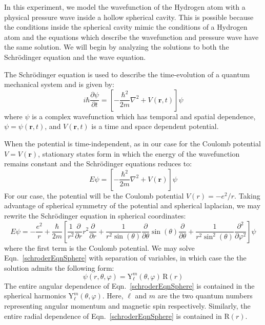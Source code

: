 \documentclass[12pt]{article}
\renewcommand{\vec}[1]{\mathbf{#1}} %
\newcommand{\ppd}[1]{\frac{\partial}{\partial#1}}
\newcommand{\ppsd}[1]{\frac{\partial^2}{\partial #1^2}}
\newcommand{\ppnd}[2]{\frac{\partial #1}{\partial #2}}
\newcommand{\lap}{\nabla^2}
\let\originaleqref=\eqref
\renewcommand{\eqref}{Eqn.\ \originaleqref}
\begin{document}
In this experiment, we model the wavefunction of the Hydrogen atom with a physical pressure wave inside a hollow spherical cavity. This is possible because the conditions inside the spherical cavity mimic the conditions of a Hydrogen atom and the equations which describe the wavefunction and pressure wave have the same solution. We will begin by analyzing the solutions to both the Schr\"odinger equation and the wave equation.


The Schr\"odinger equation is used to describe the time-evolution of a quantum mechanical system and is given by:
\begin{equation}
\label{schrodingerEqn1}
	i\hbar\ppnd{\psi}{t} = \left[-\frac{\hbar^2}{2m}\lap+ V(\vec{r},t)\right] \psi
\end{equation}
where $\psi$ is a complex wavefunction which has temporal and spatial dependence, $\psi = \psi{(\vec{r},t)}$, and $V(\vec{r},t)$ is a time and space dependent potential.

When the potential is time-independent, as in our case for the Coulomb potential $V = V(\vec{r})$, stationary states form in which the energy of the wavefunction remains constant and the Schr\"odinger equations reduces to:
\begin{equation}
\label{schrodingerEqn2}
	E \psi = \left[-\frac{\hbar^2}{2m}\lap + V(\vec{r})\right] \psi
\end{equation}
For our case, the potential will be the Coulomb potential $V(r) = -e^2/r$. Taking advantage of spherical symmetry of the potential and spherical laplacian, we may rewrite the Schr\"odinger equation in spherical coordinates:
\begin{equation}
\label{schroderEqnSphere}
	E \psi = -\frac{e^2}{r} + \frac{\hbar}{2m} \left[ \frac{1}{r^2} \ppd{r}r^2 \ppd{r} + \frac{1}{r^2\sin(\theta)}\ppd{\theta}\sin(\theta)\ppd{\theta} + \frac{1}{r^2\sin^2(\theta)} \ppsd{\varphi} \right] \psi 
\end{equation}
where the first term is the Coulomb potential. We may solve \eqref{schroderEqnSphere} with separation of variables, in which case the the solution admits the following form:
\begin{equation}
	\psi(r,\theta,\varphi) = \mathrm{Y}_\ell^m(\theta,\varphi) \, \mathrm{R}(r)
\end{equation}
The entire angular dependence of \eqref{schroderEqnSphere} is contained in the spherical harmonics $\mathrm{Y}_\ell^m(\theta,\varphi)$. Here, $\ell$ and $m$ are the two quantum numbers representing angular momentum and magnetic spin respectively. Similarly, the entire radial dependence of \eqref{schroderEqnSphere} is contained in $\mathrm{R}(r)$.
\end{document}
